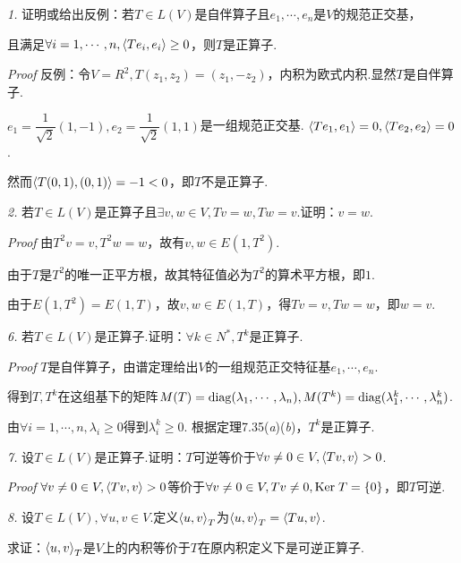 \textit{1.}
证明或给出反例：若\(T \in L(V)\)是自伴算子且\(e_1,\cdots,e_n\)是\(V\)的规范正交基，

且满足\(\forall i=1,\cdots,n,\left\langle Te_i,e_i \right\rangle \geq 0\)，则\(T\)是正算子.

\textit{Proof}
反例：令\(V=R^2,T(z_1,z_2)=(z_1,-z_2)\)，内积为欧式内积.显然\(T\)是自伴算子.

\(e_1=\dfrac{1}{\sqrt{2}}(1,-1),e_2=\dfrac{1}{\sqrt{2}}(1,1)\)是一组规范正交基.
\(\left\langle Te_1,e_1 \right\rangle=0,\left\langle Te_2,e_2 \right\rangle=0\).

然而\(\left\langle T(0,1),(0,1) \right\rangle=-1<0\)，即\(T\)不是正算子.

\hspace*{\fill}

\textit{2.}
若\(T \in L(V)\)是正算子且\(\exists v,w \in V,Tv=w,Tw=v\).证明：\(v=w\).

\textit{Proof}
由\(T^2v=v,T^2w=w\)，故有\(v,w \in E(1,T^2)\).

由于\(T\)是\(T^2\)的唯一正平方根，故其特征值必为\(T^2\)的算术平方根，即\(1\).

由于\(E(1,T^2)=E(1,T)\)，故\(v,w \in E(1,T)\)，得\(Tv=v,Tw=w\)，即\(w=v\).

\hspace*{\fill}

\textit{6.}
若\(T \in L(V)\)是正算子.证明：\(\forall k \in N^*,T^k\)是正算子.

\textit{Proof}
\(T\)是自伴算子，由谱定理给出\(V\)的一组规范正交特征基\(e_1,\cdots,e_n\).

得到\(T,T^k\)在这组基下的矩阵\(M(T)=\mathrm{diag}(\lambda_1,\cdots,\lambda_n),M(T^k)=\mathrm{diag}(\lambda_1^k,\cdots,\lambda_n^k)\).

由\(\forall i=1,\cdots,n,\lambda_i \geq 0\)得到\(\lambda_i^k \geq 0\).
根据定理7.35(\textit{a})(\textit{b})，\(T^k\)是正算子.

\hspace*{\fill}

\textit{7.}
设\(T \in L(V)\)是正算子.证明：\(T\)可逆等价于\(\forall v \ne 0 \in V,\left\langle Tv,v \right\rangle>0\).

\textit{Proof}
\(\forall v \ne 0 \in V,\left\langle Tv,v \right\rangle>0\)等价于\(\forall v \ne 0 \in V,Tv \ne 0,\mathrm{Ker \;} T=\{0\}\)，即\(T\)可逆.

\hspace*{\fill}

\textit{8.}
设\(T \in L(V),\forall u,v \in V\).定义\(\left\langle u,v \right\rangle_T\)为\(\left\langle u,v \right\rangle_T=\left\langle Tu,v \right\rangle\).

求证：\(\left\langle u,v \right\rangle_T\)是\(V\)上的内积等价于\(T\)在原内积定义下是可逆正算子.

